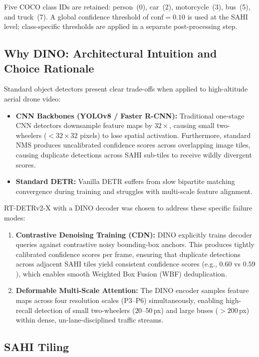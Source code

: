 Five COCO class IDs are retained: person~(0), car~(2), motorcycle~(3), bus~(5), and
truck~(7).  A global confidence threshold of $\text{conf} = 0.10$ is used at the SAHI
level; class-specific thresholds are applied in a separate post-processing step.

\subsection{Why DINO: Architectural Intuition and Choice Rationale}

Standard object detectors present clear trade-offs when applied to high-altitude aerial drone video:
\begin{itemize}
    \item \textbf{CNN Backbones (YOLOv8 / Faster R-CNN):} Traditional one-stage CNN detectors downsample feature maps by $32\times$, causing small two-wheelers ($< 32 \times 32$ pixels) to lose spatial activation. Furthermore, standard NMS produces uncalibrated confidence scores across overlapping image tiles, causing duplicate detections across SAHI sub-tiles to receive wildly divergent scores.
    \item \textbf{Standard DETR:} Vanilla DETR suffers from slow bipartite matching convergence during training and struggles with multi-scale feature alignment.
\end{itemize}

RT-DETRv2-X with a DINO decoder was chosen to address these specific failure modes:
\begin{enumerate}
    \item \textbf{Contrastive Denoising Training (CDN):} DINO explicitly trains decoder queries against contrastive noisy bounding-box anchors. This produces tightly calibrated confidence scores per frame, ensuring that duplicate detections across adjacent SAHI tiles yield consistent confidence scores (e.g., $0.60$ vs $0.59$), which enables smooth Weighted Box Fusion (WBF) deduplication.
    \item \textbf{Deformable Multi-Scale Attention:} The DINO encoder samples feature maps across four resolution scales (P3--P6) simultaneously, enabling high-recall detection of small two-wheelers ($20$--$50$\,px) and large buses ($>200$\,px) within dense, un-lane-disciplined traffic streams.
\end{enumerate}

\subsection{SAHI Tiling}

